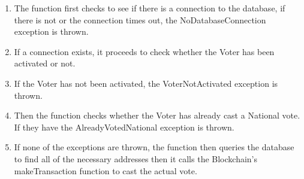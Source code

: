 \begin{enumerate}
\begin{enumerate}
		\begin{enumerate}
			\item The function first checks to see if there is a connection to the database, if there is not or the connection times out, the NoDatabaseConnection exception is thrown. 
			\item If a connection exists, it proceeds to check whether the Voter has been activated or not. 
			\item If the Voter has not been activated, the VoterNotActivated exception is thrown. 
			\item Then the function checks whether the Voter has already cast a National vote. If they have the AlreadyVotedNational exception is thrown.
			\item If none of the exceptions are thrown, the function then queries the database to find all of the necessary addresses then it calls the Blockchain's makeTransaction function to cast the actual vote.  
			
		\end{enumerate}
	\end{enumerate}
		
	\end{enumerate}





